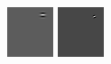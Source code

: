 \begin{figure}[ht]
 \includegraphics[width=\textwidth*11/100]{ch5/figures/firstgabor_Full_5.png}
 \includegraphics[width=\textwidth*11/100]{ch5/figures/firstgabor_Full_6.png}

\end{figure}
